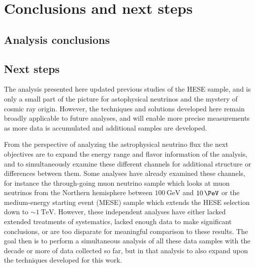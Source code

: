 \chapter{Conclusions and next steps\label{chapter:conclusions}}
\section{Analysis conclusions\label{sec:analysis_conclusions}}
\begingroup
\graphicspath{{results/HESE_Final_Paper/}}

\endgroup
\FloatBarrier

\section{Next steps}
The analysis presented here updated previous studies of the HESE sample, and is only a small part of the picture for astophysical neutrinos and the mystery of cosmic ray origin.
However, the techniques and solutions developed here remain broadly applicable to future analyses, and will enable more precise measurements as more data is accumulated and additional samples are developed.

From the perspective of analyzing the astrophysical neutrino flux the next objectives are to expand the energy range and flavor information of the analysis, and to simultaneously examine these different channels for additional structure or differences between them.
Some analyses have already examined these channels, for instance the through-going muon neutrino sample which looks at muon neutrinos from the Northern hemisphere between $\SI{100}\GeV$ and $\SI{10}\PeV$ or the medium-energy starting event (MESE) sample which extends the HESE selection down to $\sim\SI{1}\TeV$.
However, these independent analyses have either lacked extended treatments of systematics, lacked enough data to make significant conclusions, or are too disparate for meaningful comparison to these results.
The goal then is to perform a simultaneous analysis of all these data samples with the decade or more of data collected so far, but in that analysis to also expand upon the techniques developed for this work.

